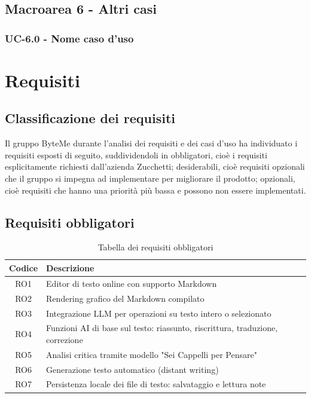 \documentclass[11pt,a4paper]{article}
\begin{document}
\subsection{Macroarea 6 - Altri casi}
\subsubsection{UC-6.0 - Nome caso d'uso}


\newpage

\section{Requisiti}
\subsection{Classificazione dei requisiti}
Il gruppo ByteMe durante l'analisi dei requisiti e dei casi d'uso ha individuato i requisiti esposti di seguito, suddividendoli in obbligatori, cioè i requisiti esplicitamente richiesti dall'azienda Zucchetti; desiderabili, cioè requisiti opzionali che il gruppo si impegna ad implementare per migliorare il prodotto; opzionali, cioè requisiti che hanno una priorità più bassa e possono non essere implementati.

\subsection{Requisiti obbligatori}
\begin{table}[H]
    \centering
    \begin{tabular}{|c|>{\raggedright\arraybackslash}p{}|c|c|}
        \hline
        \textbf{Codice} & \textbf{Descrizione} \\
        \hline
        RO1 & Editor di testo online con supporto Markdown \\
        \hline
        RO2 & Rendering grafico del Markdown compilato \\
        \hline
        RO3 & Integrazione LLM per operazioni su testo intero o selezionato \\
        \hline
        RO4 & Funzioni AI di base sul testo: riassunto, riscrittura, traduzione, correzione \\
        \hline
        RO5 & Analisi critica tramite modello "Sei Cappelli per Pensare" \\
        \hline
        RO6 & Generazione testo automatico (distant writing) \\
        \hline
        RO7 & Persistenza locale dei file di testo: salvataggio e lettura note \\
        \hline
    \end{tabular}
    \caption{Tabella dei requisiti obbligatori}
\end{table}
\end{document}
